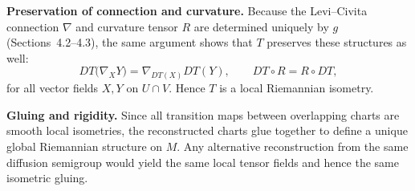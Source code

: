 \documentclass[11pt]{amsart}
\theoremstyle{definition}
\theoremstyle{remark}
\begin{document}
\medskip
\noindent\textbf{Preservation of connection and curvature.}
Because the Levi--Civita connection $\nabla$ and curvature tensor $R$ are determined uniquely
by $g$ (Sections~4.2--4.3), the same argument shows that $T$ preserves these structures as well:
\[
DT\big(\nabla_X Y\big) = \nabla_{DT(X)} DT(Y),
\qquad
DT\circ R = R\circ DT,
\]
for all vector fields $X,Y$ on $U\cap V$.
Hence $T$ is a local Riemannian isometry.

\medskip
\noindent\textbf{Gluing and rigidity.}
Since all transition maps between overlapping charts are smooth local isometries,
the reconstructed charts glue together to define a unique global Riemannian structure on $M$.
Any alternative reconstruction from the same diffusion semigroup would yield the same local
tensor fields and hence the same isometric gluing.
\end{document}
